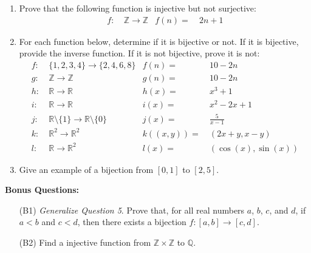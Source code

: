 \documentclass{article}
\begin{document}
\begin{enumerate}
            \begin{proof}We will show that $f$ is neighter injective nor surjective.

                \begin{caseof}
                \end{caseof}
            \end{proof}

	\item Prove that the following function is injective but not surjective:
		  \begin{align*}
			f : & \ \mathbb{Z} \rightarrow \mathbb{Z} & f(n) = & \ 2n+1
		  \end{align*}

	\item For each function below, determine if it is bijective or not.  If it is bijective, provide the inverse function.  If it is not bijective, prove it is not:
		  \begin{align*}
			f : & \ \{ 1, 2, 3, 4 \} \rightarrow \{ 2, 4, 6, 8 \} & f(n) = & \ 10 - 2n \\
			g : & \ \mathbb{Z} \rightarrow \mathbb{Z} & g(n) = & \ 10 - 2n \\
			h : & \ \mathbb{R} \rightarrow \mathbb{R} & h(x) = & \ x^3 + 1 \\
			i : & \ \mathbb{R} \rightarrow \mathbb{R} & i(x) = & \ x^2 - 2x + 1 \\
			j : & \ \mathbb{R} \setminus \{ 1 \} \rightarrow \mathbb{R} \setminus \{ 0 \} & j(x) = & \ \frac{5}{x-1} \\
			k : & \ \mathbb{R}^2 \rightarrow \mathbb{R}^2 & k((x,y)) = & \ (2x+y, x-y) \\
			l : & \ \mathbb{R} \rightarrow \mathbb{R}^2 & l(x) = & \ (\cos(x), \sin(x))
		  \end{align*}

	\item Give an example of a bijection from $[0,1]$ to $[2,5]$.
    \end{enumerate}

    \newpage
    \textbf{Bonus Questions:}

    \begin{itemize}

	\item [(B1)] \textit{Generalize Question 5}. Prove that, for all real numbers $a$, $b$, $c$, and $d$, if $a < b$ and $c < d$, then there exists a bijection $f : [a,b]     \rightarrow [c,d]$.

	\item [(B2)] Find a injective function from $\mathbb{Z} \times \mathbb{Z}$ to $\mathbb{Q}$.
    \end{itemize}
\end{document}
